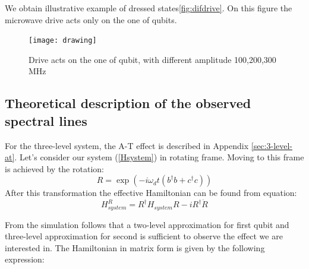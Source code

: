 \documentclass[%
 aip,
 amsmath,amssymb,
 reprint,%
]{revtex4-1}
\begin{document}
We obtain illustrative example of dressed states\autoref{fig:difdrive}. On this figure the microwave drive acts only on the one of qubits. 
\begin{figure}
	\centering
	\texttt{[image: drawing]}
	\caption{Drive acts on the one of qubit, with different amplitude 100,200,300 MHz}
	\label{fig:difdrive}
\end{figure}


\subsection{Theoretical description of the observed spectral lines}
For the three-level system, the A-T effect is described in Appendix \ref{sec:3-level-at}. Let's consider our system (\autoref{Hsystem}) in rotating frame. Moving to this frame is achieved by the rotation:
\begin{equation}
R = \exp(-i\omega_d t (b^{\dagger}b+c^{\dagger}c))
\end{equation}  
After this transformation the effective Hamiltonian can be found from equation:
\begin{equation}
H_{system}^R = R^{\dagger}H_{system}R-iR^{\dagger}\dot{R}
\end{equation}

From the simulation follows that a two-level approximation for first qubit and three-level approximation for second is sufficient to observe the effect we are interested in. The Hamiltonian in matrix form is given by the following expression:
\end{document}

